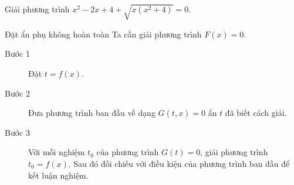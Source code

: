 \begin{bt}%
	Giải phương trình $ x^2-2x+4+\sqrt{x(x^2+4)}=0. $
\end{bt}

\begin{dang}{Đặt ẩn phụ không hoàn toàn}
	Ta cần giải phương trình $ F(x)=0 $.
	
		\begin{description}
			\item[Bước 1] Đặt $ t=f(x)$.
			\item[Bước 2] Đưa phương trình ban đầu về dạng $ G(t,x)=0 $ ẩn $ t $ đã biết cách giải.
			\item[Bước 3] Với mỗi nghiệm $ t _0$ của phương trình $ G(t)=0 $,  giải phương trình $ t_0=f(x)$. Sau đó đối  chiếu với điều kiện của phương trình ban đầu để kết luận nghiệm.
		\end{description}

\end{dang}

